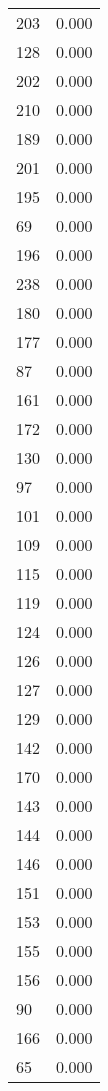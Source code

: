 \begin{table}
\begin{tabular}{lr}
203 & 0.000 \\
128 & 0.000 \\
202 & 0.000 \\
210 & 0.000 \\
189 & 0.000 \\
201 & 0.000 \\
195 & 0.000 \\
69 & 0.000 \\
196 & 0.000 \\
238 & 0.000 \\
180 & 0.000 \\
177 & 0.000 \\
87 & 0.000 \\
161 & 0.000 \\
172 & 0.000 \\
130 & 0.000 \\
97 & 0.000 \\
101 & 0.000 \\
109 & 0.000 \\
115 & 0.000 \\
119 & 0.000 \\
124 & 0.000 \\
126 & 0.000 \\
127 & 0.000 \\
129 & 0.000 \\
142 & 0.000 \\
170 & 0.000 \\
143 & 0.000 \\
144 & 0.000 \\
146 & 0.000 \\
151 & 0.000 \\
153 & 0.000 \\
155 & 0.000 \\
156 & 0.000 \\
90 & 0.000 \\
166 & 0.000 \\
65 & 0.000 \\
\bottomrule
\end{tabular}
\end{table}
